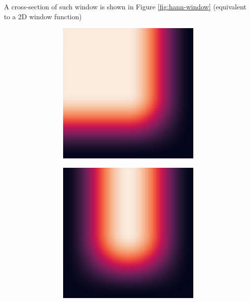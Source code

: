 A cross-section of such window is shown in Figure \ref{fig:hann-window} (equivalent to a 2D window function)
\begin{figure}
  \centering
  \begin{subfigure}{0.5\textwidth}
    \centering
    \begin{subfigure}{.32\textwidth}
      \centering
      \includegraphics[width=\textwidth]{Images/hann_window_00.jpg}
    \end{subfigure}
    \begin{subfigure}{.32\textwidth}
      \centering
      \includegraphics[width=\textwidth]{Images/hann_window_10.jpg}

\end{subfigure}
\end{subfigure}
\end{figure}
